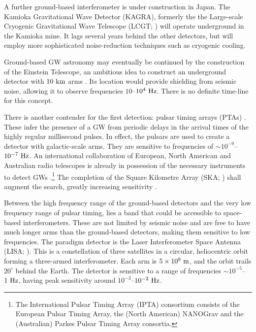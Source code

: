 A further ground-based interferometer is under construction in Japan. The Kamioka Gravitational Wave Detector (KAGRA), formerly the the Large-scale Cryogenic Gravitational Wave Telescope (LCGT; \citealt{Kuroda1999,Kuroda2010}) will operate underground in the Kamioka mine. It lags several years behind the other detectors, but will employ more sophisticated noise-reduction techniques such as cryogenic cooling.

Ground-based GW astronomy may eventually be continued by the construction of the Einstein Telescope, an ambitious idea to construct an underground detector with $10~\mathrm{km}$ arms \citep{Punturo2010,Hild2011,Sathyaprakash2012}. Its location would provide shielding from seismic noise, allowing it to observe frequencies $10$--$10^4~\mathrm{Hz}$. There is no definite time-line for this concept.

There is another contender for the first detection: pulsar timing arrays (PTAs) \citep{McWilliams2012,Sesana2012a}. These infer the presence of a GW from periodic delays in the arrival times of the highly regular millisecond pulses. In effect, the pulsars are used to create a detector with galactic-scale arms. They are sensitive to frequencies of $\sim10^{-9}$--$10^{-7}~\mathrm{Hz}$. An international collaboration of European, North American and Australian radio telescopes is already in possession of the necessary instruments to detect GWs \citep{Hobbs2010}.\footnote{The International Pulsar Timing Array (IPTA) consortium consists of the European Pulsar Timing Array, the (North American) NANOGrav and the (Australian) Parkes Pulsar Timing Array consortia.} The completion of the Square Kilometre Array (SKA; \citealt{Dewdney2009}) shall augment the search, greatly increasing sensitivity \citep{Kramer2004}.

Between the high frequency range of the ground-based detectors and the very low frequency range of pulsar timing, lies a band that could be accessible to space-based interferometers. These are not limited by seismic noise and are free to have much longer arms than the ground-based detectors, making them sensitive to low frequencies. The paradigm detector is the Laser Interferometer Space Antenna (LISA; \citealt{Bender1998, Danzmann2003}). This is a constellation of three satellites in a circular, heliocentric orbit forming a three-armed interferometer. Each arm is $5 \times 10^9~\mathrm{m}$, and the orbit trails $20^{\circ}$ behind the Earth. The detector is sensitive to a range of frequencies $\sim10^{-5}$--$1~\mathrm{Hz}$, having peak sensitivity around $10^{-3}$--$10^{-2}~\mathrm{Hz}$.


